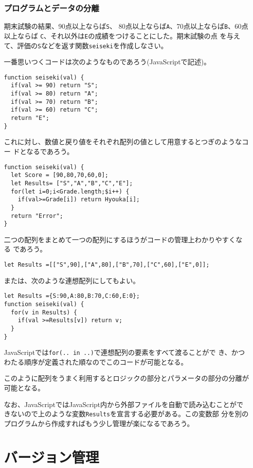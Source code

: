 \subsubsection{プログラムとデータの分離}
\begin{Exec}\upshape
 期末試験の結果、90点以上ならば\texttt{S}、
 80点以上ならば\texttt{A}、70点以上ならば\texttt{B}、60点以上ならば
 \texttt{C}、それ以外は\texttt{E}の成績をつけることにした。期末試験の点
 を与えて、評価の\texttt{S}などを返す関数\texttt{seiseki}を作成しなさい。
\end{Exec}
一番思いつくコードは次のようなものであろう(JavaScriptで記述)。
\begin{Verbatim}
function seiseki(val) {
  if(val >= 90) return "S";
  if(val >= 80) return "A";
  if(val >= 70) return "B";
  if(val >= 60) return "C";
  return "E";
}
\end{Verbatim}
これに対し、数値と戻り値をそれぞれ配列の値として用意するとつぎのようなコー
ドとなるであろう。
\begin{Verbatim}
function seiseki(val) {
  let Score = [90,80,70,60,0];
  let Results= ["S","A","B","C","E"];
  for(let i=0;i<Grade.length;$i++) {
    if(val>=Grade[i]) return Hyouka[i];
  }
  return "Error";
}
\end{Verbatim}
二つの配列をまとめて一つの配列にするほうがコードの管理上わかりやすくなる
であろう。
\begin{Verbatim}
let Results =[["S",90],["A",80],["B",70],["C",60],["E",0]];
\end{Verbatim}
または、次のような連想配列にしてもよい。
\begin{Verbatim}
let Results ={S:90,A:80,B:70,C:60,E:0};
function seiseki(val) {
  for(v in Results) {
    if(val >=Results[v]) return v;
  }
}
\end{Verbatim}
JavaScriptでは\texttt{for(.. in ..)}で連想配列の要素をすべて渡ることがで
き、かつわたる順序が定義された順なのでこのコードが可能となる。

このように配列をうまく利用するとロジックの部分とパラメータの部分の分離が
可能となる。

なお、JavaScriptではJavaScript内から外部ファイルを自動で読み込むことがで
きないので上のような変数\texttt{Results}を宣言する必要がある。この変数部
分を別のプログラムから作成すればもう少し管理が楽になるであろう。


\section{バージョン管理}
